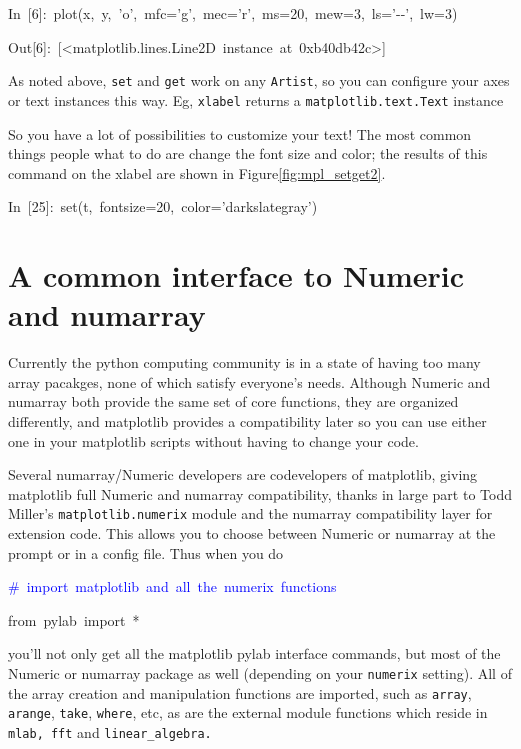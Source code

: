 \begin{lyxcode}


In~{[}6]:~plot(x,~y,~'o',~mfc='g',~mec='r',~ms=20,~mew=3,~ls='-{}-',~lw=3)

Out{[}6]:~{[}<matplotlib.lines.Line2D~instance~at~0xb40db42c>]


\end{lyxcode}
As noted above, \texttt{set} and \texttt{get} work on any \texttt{Artist},
so you can configure your axes or text instances this way.  Eg, \texttt{xlabel}
returns a \texttt{matplotlib.text.Text} instance 

\begin{lyxcode}

\end{lyxcode}
So you have a lot of possibilities to customize your text!  The most
common things people what to do are change the font size and color;
the results of this command on the xlabel are shown in Figure\ref{fig:mpl_setget2}.

\begin{lyxcode}


In~{[}25]:~set(t,~fontsize=20,~color='darkslategray')~
\end{lyxcode}

\section[numerix]{A common interface to Numeric and numarray}

Currently the python computing community is in a state of having too
many array pacakges, none of which satisfy everyone's needs. Although
Numeric and numarray both provide the same set of core functions,
they are organized differently, and matplotlib provides a compatibility
later so you can use either one in your matplotlib scripts without
having to change your code.

Several numarray/Numeric developers are codevelopers of matplotlib,
giving matplotlib full Numeric and numarray compatibility, thanks
in large part to Todd Miller's \texttt{matplotlib.numerix} module
and the numarray compatibility layer for extension code. This allows
you to choose between Numeric or numarray at the prompt or in a config
file. Thus when you do

\begin{lyxcode}
\textcolor{blue}{\#~import~matplotlib~and~all~the~numerix~functions}

from~pylab~import~{*}
\end{lyxcode}
you'll not only get all the matplotlib pylab interface commands, but
most of the Numeric or numarray package as well (depending on your
\texttt{numerix} setting). All of the array creation and manipulation
functions are imported, such as \texttt{array}, \texttt{arange}, \texttt{take},
\texttt{where}, etc, as are the external module functions which reside
in \texttt{mlab, fft} and \texttt{linear\_algebra.} 


